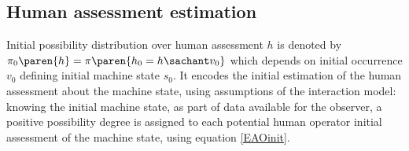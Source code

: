 \subsection{Human assessment estimation}
Initial possibility distribution over human assessment $h$ 
is denoted by $\pi_0 \paren{ h } = \pi \paren{ h_0 = h \sachant v_0 }$
which depends on initial occurrence $v_0$ 
defining initial machine state $s_0$.
It encodes the initial estimation 
of the human assessment about the machine state,
using assumptions of the interaction model: 
knowing the initial machine state, 
as part of data available for the observer, 
a positive possibility degree is assigned 
to each potential human operator initial assessment 
of the machine state,
using equation \ref{EAOinit}.

